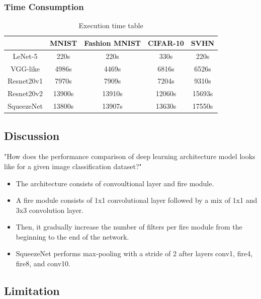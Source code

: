 \documentclass{beamer}
\begin{document}
\begin{frame}\frametitle{Time Consumption}
\begin{table}
	\centering
	\begin{tabular}{ |c|c|c|c|c| } 
		\hline
		& MNIST & Fashion MNIST & CIFAR-10 & SVHN \\ 
		\hline
		LeNet-5	& 220s & 220s & 330s & 220s\\
		\hline 
		VGG-like & 4986s	& 4469s & 6816s & 6526s\\ 
		\hline
		Resnet20v1 & 7970s & 7909s	& 7204s & 9310s\\ 
		\hline
		Resnet20v2 & 13900s & 	13910s & 	12060s & 	15693s\\
		\hline
		SqueezeNet & 13800s & 	13907s & 	13630s & 	17550s\\
		\hline
	\end{tabular}
	\caption{Execution time table}
	\label{tab:times}
\end{table}
\end{frame}

\subsection{Discussion}
"How does the performance comparison of deep learning architecture
model looks like for a given image classification dataset?"
\begin{itemize}
	\item The architecture consists of convoultional layer and fire module.  
	\item  A fire module consists of 1x1 convolutional layer followed by a mix of 1x1 and 3x3 convolution layer.
	\item Then, it gradually increase the number of filters per fire module from the beginning to the end of the network.
	\item SqueezeNet performs max-pooling with a stride of 2 after layers conv1, fire4, fire8, and conv10.
\end{itemize} 
\subsection{Limitation}
\end{document}
